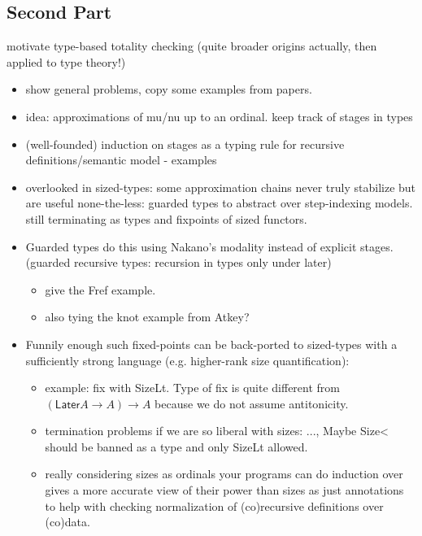 \documentclass{book}
\begin{document}
\subsection{Second Part}

motivate type-based totality checking (quite broader origins actually, then applied to type theory!)

  \begin{itemize}
  \item show general problems, copy some examples from papers.
  \item idea: approximations of mu/nu up to an ordinal. keep track of stages in types
  \item (well-founded) induction on stages as a typing rule for recursive definitions/semantic model
    - examples
  \item overlooked in sized-types: some approximation chains never truly
  stabilize but are useful none-the-less: guarded types to abstract
  over step-indexing models. still terminating as types and fixpoints of sized functors.
  \item Guarded types do this using Nakano's modality instead of explicit stages. (guarded recursive types: recursion in types only under later)
    \begin{itemize}
    \item give the Fref example.
    \item also tying the knot example from Atkey?
    \end{itemize}

  \item Funnily enough such fixed-points can be back-ported to
    sized-types with a sufficiently strong language (e.g. higher-rank
    size quantification):
    \begin{itemize}
    \item example: fix with SizeLt. Type of fix is quite different from
    $(\mathsf{Later} A \to  A) \to A$ because we do not assume antitonicity.

    \item termination problems if we are so liberal with sizes: ..., Maybe Size< should be banned as a type and only SizeLt allowed.
    \item really considering sizes as ordinals your programs can do
         induction over gives a more accurate view of their power than sizes as just
         annotations to help with checking normalization of (co)recursive definitions over (co)data.
    \end{itemize}
    \end{itemize}
\end{document}

